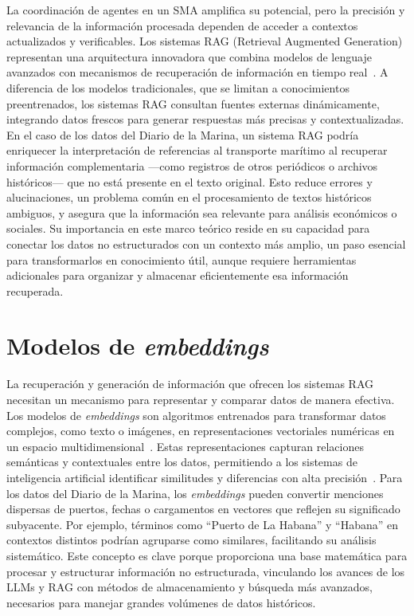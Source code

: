 La coordinación de agentes en un SMA amplifica su potencial, pero la precisión y relevancia de la información procesada dependen de acceder a contextos actualizados y verificables. Los sistemas RAG (Retrieval Augmented Generation) representan una arquitectura innovadora que combina modelos de lenguaje avanzados con mecanismos de recuperación de información en tiempo real~\cite{gao2024retrievalaugmented,lewis2020retrievalaugmented}. A diferencia de los modelos tradicionales, que se limitan a conocimientos preentrenados, los sistemas RAG consultan fuentes externas dinámicamente, integrando datos frescos para generar respuestas más precisas y contextualizadas.
En el caso de los datos del Diario de la Marina, un sistema RAG podría enriquecer la interpretación de referencias al transporte marítimo al recuperar información complementaria —como registros de otros periódicos o archivos históricos— que no está presente en el texto original. Esto reduce errores y alucinaciones, un problema común en el procesamiento de textos históricos ambiguos, y asegura que la información sea relevante para análisis económicos o sociales. Su importancia en este marco teórico reside en su capacidad para conectar los datos no estructurados con un contexto más amplio, un paso esencial para transformarlos en conocimiento útil, aunque requiere herramientas adicionales para organizar y almacenar eficientemente esa información recuperada.

\section{Modelos de \textit{embeddings}}\label{seq_5}

La recuperación y generación de información que ofrecen los sistemas RAG necesitan un mecanismo para representar y comparar datos de manera efectiva. Los modelos de \textit{embeddings} son algoritmos entrenados para transformar datos complejos, como texto o imágenes, en representaciones vectoriales numéricas en un espacio multidimensional~\cite{mikolov2013efficient}. Estas representaciones capturan relaciones semánticas y contextuales entre los datos, permitiendo a los sistemas de inteligencia artificial identificar similitudes y diferencias con alta precisión~\cite{mikolov2013efficient}.
Para los datos del Diario de la Marina, los \textit{embeddings} pueden convertir menciones dispersas de puertos, fechas o cargamentos en vectores que reflejen su significado subyacente. Por ejemplo, términos como ``Puerto de La Habana'' y ``Habana'' en contextos distintos podrían agruparse como similares, facilitando su análisis sistemático. Este concepto es clave porque proporciona una base matemática para procesar y estructurar información no estructurada, vinculando los avances de los LLMs y RAG con métodos de almacenamiento y búsqueda más avanzados, necesarios para manejar grandes volúmenes de datos históricos.


